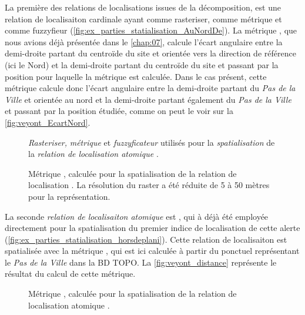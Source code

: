 La première des relations de localisations issues de la décomposition,
 est une relation de localisaiton cardinale
ayant  comme rasteriser,
 comme métrique et 
comme fuzzyfieur
(\autoref{fig:ex_parties_statialisation_AuNordDe}). La métrique
, que nous avions déjà présentée dans le
\autoref{chap:07}, calcule l'écart angulaire entre la demi-droite
partant du centroïde du site et orientée vers la direction de
référence (ici le Nord) et la demi-droite partant du centroïde du site
et passant par la position pour laquelle la métrique est
calculée. Dans le cas présent, cette métrique calcule donc l'écart
angulaire entre la demi-droite partant du \emph{Pas de la Ville} et
orientée au nord et la demi-droite partant également du \emph{Pas de
  la Ville} et passant par la position étudiée, comme on peut le voir
sur la \autoref{fig:veyont_EcartNord}.

\begin{figure}
  \centering
  
  \caption{\emph{Rasteriser,} \emph{métrique} et \emph{fuzzyficateur}
    utilisés pour la \emph{spatialisation} de la \emph{relation de
      localisation atomique} \protect{}.}
  \label{fig:ex_parties_statialisation_AuNordDe}
\end{figure}



\begin{figure}
  \centering
  
  \caption{Métrique \protect{}, calculée
    pour la spatialisation de la relation de localisation
    \protect{}. La résolution du raster a
    été réduite de 5 à 50 mètres pour la représentation.}
  \label{fig:veyont_EcartNord}
\end{figure}

La seconde \emph{relation de localisaiton atomique} est
, qui à déjà été employée
directement pour la spatialisation du premier indice de localisation
de cette alerte
(\autoref{fig:ex_parties_statialisation_horsdeplani}). Cette relation
de localisaiton est spatialisée avec la métrique
, qui est ici calculée à partir du ponctuel
représentant le \emph{Pas de la Ville} dans la BD TOPO. La
\autoref{fig:veyont_distance} représente le résultat du calcul de
cette métrique.

\begin{figure}
  \centering
  
  \caption{Métrique \protect{}, calculée pour la
    spatialisation de la relation de localisation atomique
    \protect{}.}
  \label{fig:veyont_distance}
\end{figure}


